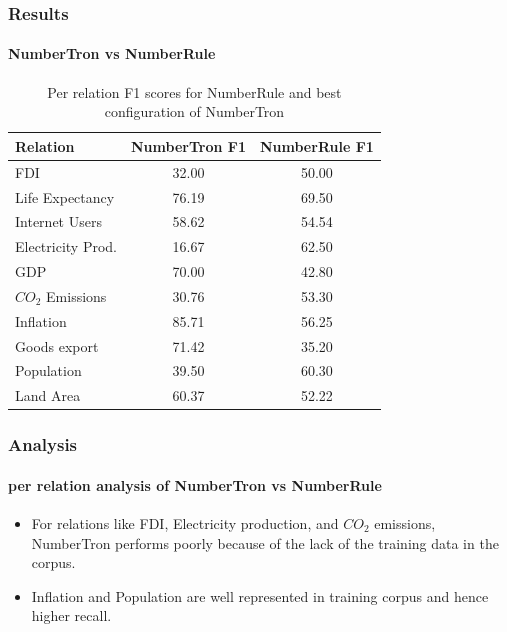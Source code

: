 \documentclass{beamer}
\begin{document}
\begin{frame}
\frametitle{Results}
\framesubtitle{NumberTron vs NumberRule}

\begin{table}
\begin{tabular}{|l|c|c|}
\hline
Relation & NumberTron F1 & NumberRule F1\\
\hline
\hline
FDI & 32.00 & 50.00\\
\hline
Life Expectancy & 76.19 & 69.50\\
\hline
Internet Users & 58.62 & 54.54\\
\hline
Electricity Prod. & 16.67 & 62.50\\
\hline
GDP & 70.00 & 42.80\\
\hline
$CO_{2}$ Emissions & 30.76 & 53.30\\
\hline
  Inflation & 85.71 & 56.25\\
\hline
Goods export & 71.42 & 35.20\\
\hline
Population & 39.50 & 60.30\\
\hline
Land Area & 60.37 & 52.22\\
\hline
\end{tabular}
\caption{Per relation F1 scores for NumberRule and best configuration of NumberTron}
\label{tab:perrelscore}
\end{table}

\end{frame}
\begin{frame}
\frametitle{Analysis}
\framesubtitle{per relation analysis of NumberTron vs NumberRule}
\begin{itemize}
\setlength\itemsep{1em}
\item For relations like FDI, Electricity production, and $CO_2$ emissions, NumberTron performs poorly because of the lack of the training data in the corpus.
\item Inflation and Population are well represented in training corpus and hence higher recall.

\end{itemize}
\end{frame}
\end{document}
